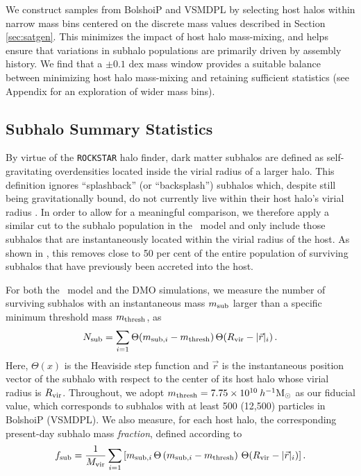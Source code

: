 \documentclass[twocolumn,apj,numberedappendix,twocolappendix,iop]{openjournal}
\begin{document}
We construct samples from BolshoiP and VSMDPL by selecting host halos within narrow mass bins centered on the discrete mass values described in Section \ref{sec:satgen}. This minimizes the impact of host halo mass-mixing, and helps ensure that variations in subhalo populations are primarily driven by assembly history. We find that a $\pm 0.1$ dex mass window provides a suitable balance between minimizing host halo mass-mixing and retaining sufficient statistics (see Appendix \jsm{\ref{sec:binwidth}} for an exploration of wider mass bins).

\subsection{Subhalo Summary Statistics}
\label{sec:counts}

By virtue of the \texttt{ROCKSTAR} halo finder, dark matter subhalos are defined as self-gravitating overdensities located inside the virial radius of a larger halo. This definition ignores ``splashback'' (or ``backsplash'') subhalos which, despite still being gravitationally bound, do not currently live within their host halo's virial radius \citep{More.etal.16, Diemer.17, Mansfield.etal.17, Haggar.etal.20}. In order to allow for a meaningful comparison, we therefore apply a similar cut to the subhalo population in the \SatGen\ model and only include those subhalos that are instantaneously located within the virial radius of the host. As shown in \citet{Green.etal.21}, this removes close to 50 per cent of the entire population of surviving subhalos that have previously been accreted into the host.

For both the \SatGen\ model and the DMO simulations, we measure the number of surviving subhalos with an instantaneous mass $m_{\rm sub}$ larger than a specific minimum threshold mass $m_{\rm thresh}$, as
%
\begin{equation}
N_{\rm sub} = \sum_{i=1} \Theta(m_{{\rm sub},i} - m_{\rm thresh}) \, \Theta(R_{\rm vir} - |\vec{r}|_i)\,.
\label{eq:Nsub}
\end{equation}
%
Here, $\Theta(x)$ is the Heaviside step function and $\vec{r}$ is the instantaneous position vector of the subhalo with respect to the center of its host halo whose virial radius is $R_{\rm vir}$. Throughout, we adopt $m_{\rm thresh} = 7.75 \times 10^{10}\>h^{-1}\rm M_\odot$ as our fiducial value, which corresponds to subhalos with at least 500 (12,500) particles in BolshoiP (VSMDPL). We also measure, for each host halo, the corresponding present-day subhalo mass \textit{fraction}, defined according to
%
\begin{equation}
    f_{\rm sub} = \frac{1}{M_{\rm vir}} \sum_{i=1} \left[ m_{{\rm sub},i}\, \Theta \left(m_{{\rm sub},i} - m_{\rm thresh} \right)\,\Theta(R_{\rm vir} - |\vec{r}|_i)\right].
\label{eq:fsub}
\end{equation}
%
\end{document}
